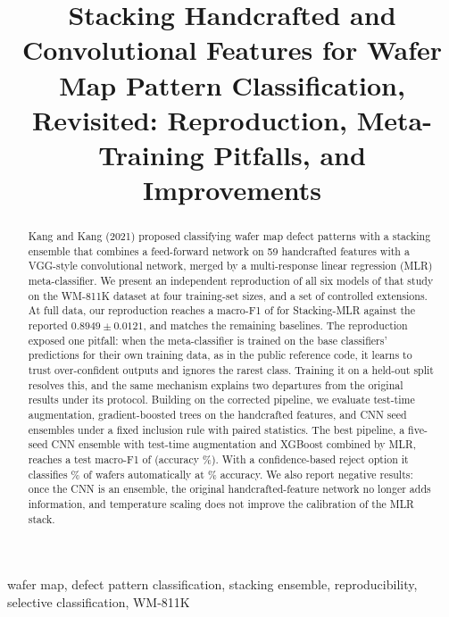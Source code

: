 \documentclass[conference]{IEEEtran}
\begin{document}
\title{Stacking Handcrafted and Convolutional Features for Wafer Map Pattern Classification, Revisited: Reproduction, Meta-Training Pitfalls, and Improvements}

\author{
}

\maketitle

\begin{abstract}
Kang and Kang (2021) proposed classifying wafer map defect patterns with a stacking ensemble that combines a
feed-forward network on 59 handcrafted features with a VGG-style convolutional network, merged by a multi-response
linear regression (MLR) meta-classifier. We present an independent reproduction of all six models of that study on the
WM-811K dataset at four training-set sizes, and a set of controlled extensions. At full data, our reproduction reaches a
macro-F1 of \ReproMLR{} for Stacking-MLR against the reported $0.8949 \pm 0.0121$, and matches the remaining baselines.
The reproduction exposed one pitfall: when the meta-classifier is trained on the base classifiers' predictions for their
own training data, as in the public reference code, it learns to trust over-confident outputs and ignores the rarest
class. Training it on a held-out split resolves this, and the same mechanism explains two departures from the original
results under its protocol. Building on the corrected pipeline, we evaluate test-time augmentation, gradient-boosted trees
on the handcrafted features, and CNN seed ensembles under a fixed inclusion rule with paired statistics. The best
pipeline, a five-seed CNN ensemble with test-time augmentation and XGBoost combined by MLR, reaches a test macro-F1 of
\FinalMacro{} (accuracy \FinalAcc\%). With a confidence-based reject option it classifies \RejCov\% of wafers
automatically at \RejAcc\% accuracy. We also report negative results: once the CNN is an ensemble, the original
handcrafted-feature network no longer adds information, and temperature scaling does not improve the calibration of the
MLR stack.
\end{abstract}

\begin{IEEEkeywords}
wafer map, defect pattern classification, stacking ensemble, reproducibility, selective classification, WM-811K
\end{IEEEkeywords}
\end{document}
